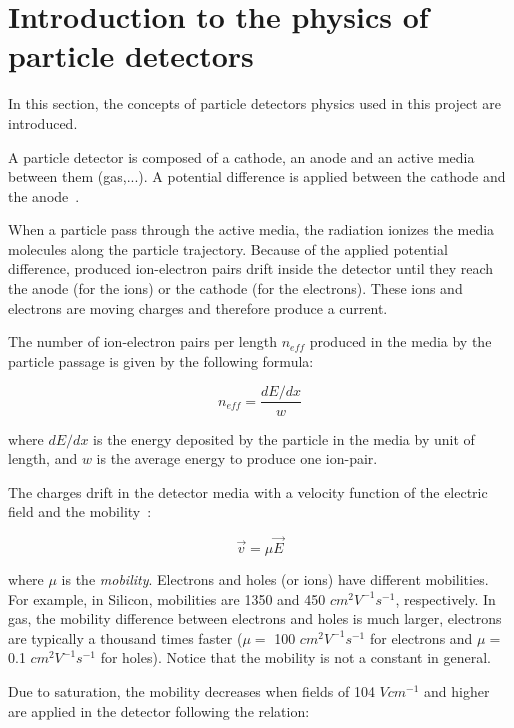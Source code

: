\documentclass[11pt]{article}
\begin{document}
\section{Introduction to the physics of particle detectors}

	\label{equations}

	In this section, the concepts of particle detectors physics used in this project
	are introduced.

	A particle detector is composed of a cathode, an anode and an active media
	between them (gas,...). A potential difference is applied between the cathode
	and the anode~\cite{lphy2236}.

	When a particle pass through the active media, the radiation ionizes the media
	molecules along the particle trajectory.
	Because of the applied potential difference,
	produced ion-electron pairs drift inside the detector until they reach the anode
	(for the ions) or the cathode (for the electrons). These ions and electrons
	are moving charges and therefore produce a current.

	The number of ion-electron pairs per length $n_{eff}$ produced in the media by the
	particle passage is given by the following formula:

	\[n_{eff} = \frac{dE/dx}{w} \]

	where $dE/dx$ is the energy deposited by the particle in the media by
	unit of length, and $w$ is the average energy to produce one ion-pair.

	The charges drift in the detector media with a velocity function of the electric
	field and the mobility~\cite{spieler2005semiconductor}:

	\begin{equation}
		\vec{v} = \mu \vec{E}
		\label{eq:charge_speed}
	\end{equation}

	where $\mu$ is the \textit{mobility}. Electrons and holes (or ions) have different
	mobilities. For example, in Silicon, mobilities are 1350 and 450 $cm^2V^{-1}s^{-1}$,
	respectively. In gas, the mobility difference between electrons and holes is
	much larger, electrons are typically a thousand times faster ($\mu =$ 100 $cm^2V^{-1}s^{-1}$
	for electrons and $\mu =$ 0.1 $cm^2V^{-1}s^{-1}$ for holes). Notice that the mobility
	is not a constant in general.

	Due to saturation, the mobility decreases when fields of 104 $V cm^{-1}$ and higher are applied in
	the detector following the relation:
\end{document}
